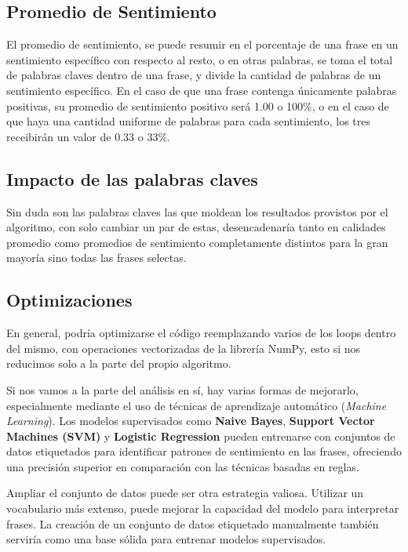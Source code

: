 \documentclass{article}
\begin{document}
    \subsection{Promedio de Sentimiento}
    El promedio de sentimiento, se puede resumir en el porcentaje de una frase en un sentimiento específico con respecto al resto, o en otras palabras, se toma el total de palabras claves dentro de una frase, y divide la cantidad de palabras de un sentimiento específico. En el caso de que una frase contenga únicamente palabras positivas, su promedio de sentimiento positivo será 1.00 o 100\%, o en el caso de que haya una cantidad uniforme de palabras para cada sentimiento, los tres receibirán un valor de 0.33 o 33\%.

    \subsection{Impacto de las palabras claves}
    Sin duda son las palabras claves las que moldean los resultados provistos por el algoritmo, con solo cambiar un par de estas, desencadenaría tanto en calidades promedio como promedios de sentimiento completamente distintos para la gran mayoría sino todas las frases selectas.

    \subsection{Optimizaciones}
    En general, podría optimizarse el código reemplazando varios de los loops dentro del mismo, con operaciones vectorizadas de la librería NumPy, esto si nos reducimos solo a la parte del propio algoritmo.

    Si nos vamos a la parte del análisis en sí, hay varias formas de mejorarlo, especialmente mediante el uso de técnicas de aprendizaje automático (\textit{Machine Learning}). Los modelos supervisados como \textbf{Naive Bayes}, \textbf{Support Vector Machines (SVM)} y \textbf{Logistic Regression} pueden entrenarse con conjuntos de datos etiquetados para identificar patrones de sentimiento en las frases, ofreciendo una precisión superior en comparación con las técnicas basadas en reglas.

    Ampliar el conjunto de datos puede ser otra estrategia valiosa. Utilizar un vocabulario más extenso, puede mejorar la capacidad del modelo para interpretar frases. La creación de un conjunto de datos etiquetado manualmente también serviría como una base sólida para entrenar modelos supervisados.
\end{document}
